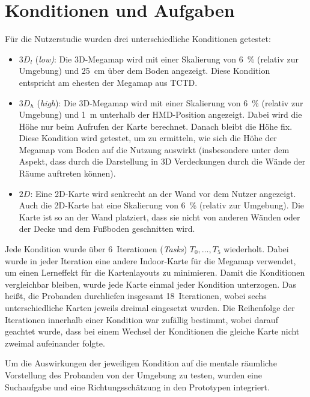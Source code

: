 \section{Konditionen und Aufgaben}
\label{sec:conditions_and_tasks}
Für die Nutzerstudie wurden drei unterschiedliche Konditionen getestet:
\begin{itemize}
    \item $3D_l$ (\emph{low)}: Die 3D-Megamap wird mit einer Skalierung von \SI{6}{\percent} (relativ zur Umgebung) und \SI{25}{\cm} über dem Boden angezeigt.
    Diese Kondition entspricht am ehesten der Megamap aus TCTD. 
    \item $3D_h$ (\emph{high}): Die 3D-Megamap wird mit einer Skalierung von \SI{6}{\percent} (relativ zur Umgebung) und \SI{1}{\metre} unterhalb der HMD-Position angezeigt.
    Dabei wird die Höhe nur beim Aufrufen der Karte berechnet.
    Danach bleibt die Höhe fix.
    Diese Kondition wird getestet, um zu ermitteln, wie sich die Höhe der Megamap vom Boden auf die Nutzung auswirkt (insbesondere unter dem Aspekt, dass durch die Darstellung in 3D Verdeckungen durch die Wände der Räume auftreten können).
    \item $2D$: Eine 2D-Karte wird senkrecht an der Wand vor dem Nutzer angezeigt.
    Auch die 2D-Karte hat eine Skalierung von \SI{6}{\percent} (relativ zur Umgebung).
    Die Karte ist so an der Wand platziert, dass sie nicht von anderen Wänden oder der Decke und dem Fußboden geschnitten wird.
\end{itemize}

Jede Kondition wurde über 6~Iterationen (\emph{Tasks}) $T_0, \dots, T_5$ wiederholt.
 Dabei wurde in jeder Iteration eine andere Indoor-Karte für die Megamap verwendet, um einen Lerneffekt für die Kartenlayouts zu minimieren.
Damit die Konditionen vergleichbar bleiben, wurde jede Karte einmal jeder Kondition unterzogen.
Das heißt, die Probanden durchliefen insgesamt 18~Iterationen, wobei sechs unterschiedliche Karten jeweils dreimal eingesetzt wurden.
Die Reihenfolge der Iterationen innerhalb einer Kondition war zufällig bestimmt, wobei darauf geachtet wurde, dass bei einem Wechsel der Konditionen die gleiche Karte nicht zweimal aufeinander folgte.

Um die Auswirkungen der jeweiligen Kondition auf die mentale räumliche Vorstellung des Probanden von der Umgebung zu testen, wurden eine Suchaufgabe und eine Richtungsschätzung in den Prototypen integriert.

